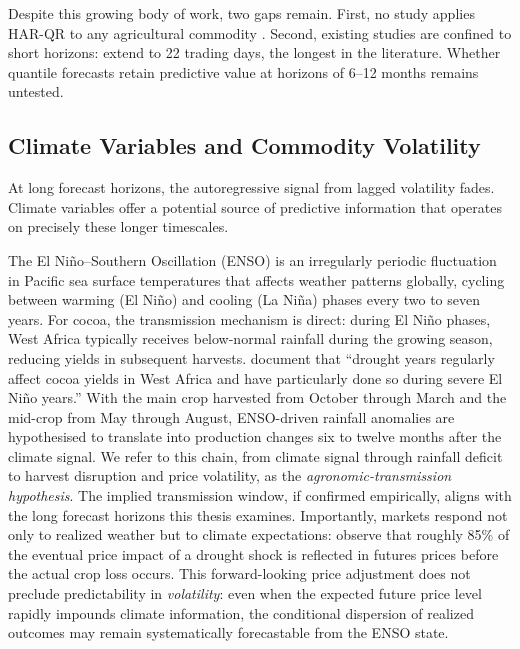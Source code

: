 Despite this growing body of work, two gaps remain. First, no study
applies HAR-QR to any agricultural commodity
\parencite{degiannakisForecastingRealizedVolatility2022,
bonatoNinoNinaForecastability2023}. Second, existing studies are
confined to short horizons: \textcite{lyocsaImprovingStockMarket2021}
extend to 22 trading days, the longest in the literature. Whether
quantile forecasts retain predictive value at horizons of 6--12 months
remains untested.

\subsection{Climate Variables and Commodity Volatility}
\label{sec:lit-enso}

At long forecast horizons, the autoregressive signal from lagged
volatility fades. Climate variables offer a potential source of
predictive information that operates on precisely these longer
timescales.

The El Niño--Southern Oscillation (ENSO) is an irregularly periodic
fluctuation in Pacific sea surface temperatures that affects weather
patterns globally, cycling between warming (El Niño) and cooling
(La Niña) phases every two to seven years. For cocoa, the transmission
mechanism is direct: during El Niño phases, West Africa typically
receives below-normal rainfall during the growing season, reducing
yields in subsequent harvests.
\textcite{schrothVulnerabilityClimateChange2016} document that ``drought
years regularly affect cocoa yields in West Africa and have particularly
done so during severe El Niño years.'' With the main crop harvested from
October through March and the mid-crop from May through August,
ENSO-driven rainfall anomalies are hypothesised to translate into production
changes six to twelve months after the climate signal. We refer to this
chain, from climate signal through rainfall deficit to harvest disruption
and price volatility, as the \emph{agronomic-transmission hypothesis}. The
implied transmission window, if confirmed empirically, aligns with the long
forecast horizons this thesis examines. Importantly,
markets respond not only to realized weather but to climate
expectations: \textcite{berganderDeepLearningCocoa2025} observe that
roughly 85\% of the eventual price impact of a drought shock is
reflected in futures prices before the actual crop loss occurs.
This forward-looking price adjustment does not preclude predictability
in \emph{volatility}: even when the expected future price level rapidly
impounds climate information, the conditional dispersion of realized
outcomes may remain systematically forecastable from the ENSO state.

